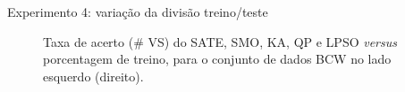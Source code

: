 \documentclass{beamer}
\begin{document}
\begin{frame}[noframenumbering]{Experimento 4: variação da divisão treino/teste}
\begin{figure}[!htbp]
    \centering
   
    \begin{subfigure}[b]{0.48\textwidth}
        \caption{}
    \end{subfigure}
    \begin{subfigure}[b]{0.48\textwidth}
        \caption{}
    \end{subfigure}
    
    
    
    \caption{Taxa de acerto (\# VS) do SATE, SMO, KA, QP e LPSO \textit{versus} porcentagem de treino, para o conjunto de dados BCW no lado esquerdo (direito).}\label{fig:accuracy_training_patterns}
\end{figure}
\end{frame}
\end{document}
